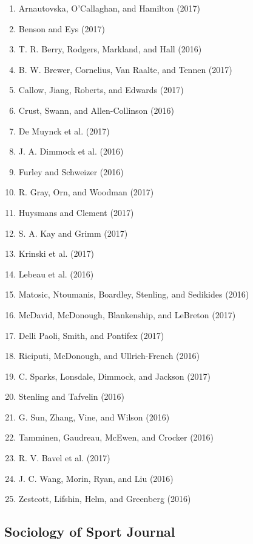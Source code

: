 \documentclass[english,man]{apa6}
\providecommand{\tightlist}{%
  \setlength{\itemsep}{0pt}\setlength{\parskip}{0pt}}
\theoremstyle{definition}
\theoremstyle{definition}
\theoremstyle{definition}
\theoremstyle{remark}
\begin{document}
\begin{enumerate}
\def\labelenumi{\arabic{enumi})}
\tightlist
\item
  Arnautovska, O'Callaghan, and Hamilton (2017)
\item
  Benson and Eys (2017)
\item
  T. R. Berry, Rodgers, Markland, and Hall (2016)
\item
  B. W. Brewer, Cornelius, Van Raalte, and Tennen (2017)
\item
  Callow, Jiang, Roberts, and Edwards (2017)
\item
  Crust, Swann, and Allen-Collinson (2016)
\item
  De Muynck et al. (2017)
\item
  J. A. Dimmock et al. (2016)
\item
  Furley and Schweizer (2016)
\item
  R. Gray, Orn, and Woodman (2017)
\item
  Huysmans and Clement (2017)
\item
  S. A. Kay and Grimm (2017)
\item
  Krinski et al. (2017)
\item
  Lebeau et al. (2016)
\item
  Matosic, Ntoumanis, Boardley, Stenling, and Sedikides (2016)
\item
  McDavid, McDonough, Blankenship, and LeBreton (2017)
\item
  Delli Paoli, Smith, and Pontifex (2017)
\item
  Riciputi, McDonough, and Ullrich-French (2016)
\item
  C. Sparks, Lonsdale, Dimmock, and Jackson (2017)
\item
  Stenling and Tafvelin (2016)
\item
  G. Sun, Zhang, Vine, and Wilson (2016)
\item
  Tamminen, Gaudreau, McEwen, and Crocker (2016)
\item
  R. V. Bavel et al. (2017)
\item
  J. C. Wang, Morin, Ryan, and Liu (2016)
\item
  Zestcott, Lifshin, Helm, and Greenberg (2016)
\end{enumerate}

\subsection{Sociology of Sport
Journal}\label{sociology-of-sport-journal}
\end{document}
